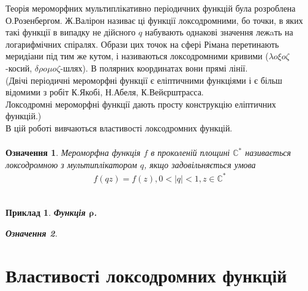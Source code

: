 \documentclass[12pt,a4paper]{article}
\begin{document}
Теорія мероморфних мультиплікативно періодичних функцій була розроблена О.Розенбергом. Ж.Валірон називає ці функції локсодромними, бо точки, в яких такі функції в випадку не дійсного $q$ набувають однакові значення лежaть на логарифмічних спіралях. Образи цих точок на сфері Рімана перетинають меридіани під тим же кутом, і називаються локсодромними кривими ($\lambda o \xi o\zeta$-косий, $\delta \rho o \mu o\zeta$-шлях). В полярних координатах вони прямі лінії.\\
(Двічі періодичні мероморфні функції є еліптичними функціями і є більш відомими з робіт К.Якобі, Н.Абеля, К.Вейєрштрасса.\\
Локсодромні мероморфні функції дають просту конструкцію еліптичних функцій.)\\
В цій роботі вивчаються властивості локсодромних функцій.
\[\begin{array}{l}
\end{array} \]

\newtheorem{ozn}{Означення}
\begin{ozn}
 Мероморфна функція $f$ в проколеній площині $\mathbb{C}^{*}$ називається локсодромною з мультиплікатором $q$, якщо задовільняється умова 
\begin{equation}\label{eq0}
\begin{array}{l}
f(qz)=f(z), 0<\vert q \vert<1, z\in \mathbb{C}^{*}
\end{array}
\end{equation}
\end{ozn}
\[\begin{array}{l}
\end{array} \]

\newtheorem{pryk}{Приклад}
\begin{pryk}
\textit{\textbf{Функція $\mathbf{\rho}$.}}
\begin{ozn}

\end{ozn}

\end{pryk}

\clearpage


\section{Властивості локсодромних функцій}
\end{document}
